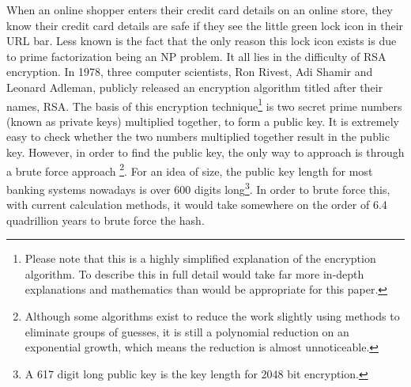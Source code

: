 \documentclass[12pt]{article}
\begin{document}
\begin{flushleft}
When an online shopper enters their credit card details on an online store, they know their credit card details are safe if they see the little green lock icon in their URL bar. Less known is the fact that the only reason this lock icon exists is due to prime factorization being an NP problem. It all lies in the difficulty of RSA encryption. In 1978, three computer scientists, Ron Rivest, Adi Shamir and Leonard Adleman, publicly released an encryption algorithm titled after their names, RSA. The basis of this encryption technique\footnote{Please note that this is a highly simplified explanation of the encryption algorithm. To describe this in full detail would take far more in-depth explanations and mathematics than would be appropriate for this paper.} is two secret prime numbers (known as private keys) multiplied together, to form a public key. It is extremely easy to check whether the two numbers multiplied together result in the public key. However, in order to find the public key, the only way to approach is through a brute force approach \footnote{Although some algorithms exist to reduce the work slightly using methods to eliminate groups of guesses, it is still a polynomial reduction on an exponential growth, which means the reduction is almost unnoticeable.}. For an idea of size, the public key length for most banking systems nowadays is over 600 digits long\footnote{A 617 digit long public key is the key length for 2048 bit encryption.}. In order to brute force this, with current calculation  methods, it would take somewhere on the order of 6.4 quadrillion years to brute force the hash. 



\end{flushleft}
\end{document}
